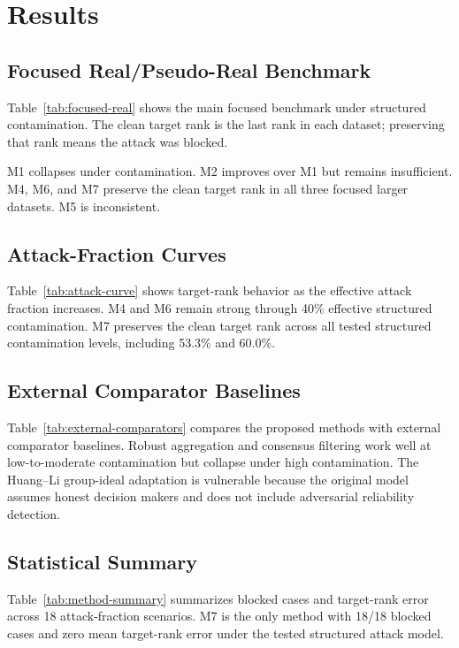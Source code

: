 \chapter{Results}

\section{Focused Real/Pseudo-Real Benchmark}
Table~\ref{tab:focused-real} shows the main focused benchmark under structured contamination. The clean target rank is the last rank in each dataset; preserving that rank means the attack was blocked.



M1 collapses under contamination. M2 improves over M1 but remains insufficient. M4, M6, and M7 preserve the clean target rank in all three focused larger datasets. M5 is inconsistent.

\section{Attack-Fraction Curves}
Table~\ref{tab:attack-curve} shows target-rank behavior as the effective attack fraction increases. M4 and M6 remain strong through 40\% effective structured contamination. M7 preserves the clean target rank across all tested structured contamination levels, including 53.3\% and 60.0\%.



\section{External Comparator Baselines}
Table~\ref{tab:external-comparators} compares the proposed methods with external comparator baselines. Robust aggregation and consensus filtering work well at low-to-moderate contamination but collapse under high contamination. The Huang--Li group-ideal adaptation is vulnerable because the original model assumes honest decision makers and does not include adversarial reliability detection.



\section{Statistical Summary}
Table~\ref{tab:method-summary} summarizes blocked cases and target-rank error across 18 attack-fraction scenarios. M7 is the only method with 18/18 blocked cases and zero mean target-rank error under the tested structured attack model.

